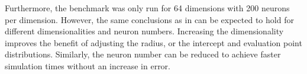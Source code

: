 
Furthermore, the benchmark was only run for 64 dimensions with \num{200} neurons per dimension.
However, the same conclusions as in \textcite{gosmann216} can be expected to hold for different dimensionalities and neuron numbers.
Increasing the dimensionality improves the benefit of adjusting the radius, or the intercept and evaluation point distributions.
Similarly, the neuron number can be reduced to achieve faster simulation times without an increase in error.

